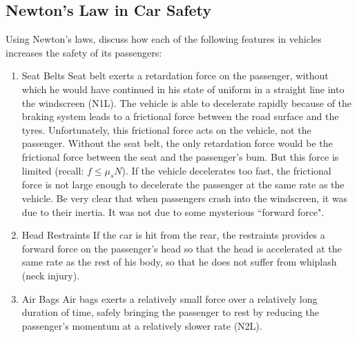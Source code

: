 \documentclass[11pt]{article}
\begin{document}
\begin{appendices}
		\section{Newton's Law in Car Safety}
		Using Newton's laws, discuss how each of the following features in vehicles increases the safety of its passengers:
		\begin{enumerate}
			\item Seat Belts
			\subitem Seat belt exerts a retardation force on the passenger, without which he would have continued in his state of uniform in a straight line into the windscreen (N1L).
			\subitem The vehicle is able to decelerate rapidly because of the braking system leads to a frictional force between the road surface and the tyres. Unfortunately, this frictional force acts on the vehicle, not the passenger. Without the seat belt, the only retardation force would be the frictional force between the seat and the passenger's bum. But this force is limited (recall: $f \leq \mu_s N$). If the vehicle decelerates too fast, the frictional force is not large enough to decelerate the passenger at the same rate as the vehicle.
			\subitem Be very clear that when passengers crash into the windscreen, it was due to their inertia. It was not due to some mysterious ``forward force".
			\item Head Restraints
			\subitem If the car is hit from the rear, the restraints provides a forward force on the passenger's head so that the head is accelerated at the same rate as the rest of his body, so that he does not suffer from whiplash (neck injury). 
			\item Air Bags
			\subitem Air bags exerts a relatively small force over a relatively long duration of time, safely bringing the passenger to rest by reducing the passenger's momentum at a relatively slower rate (N2L).
		\end{enumerate}
	\end{appendices}
\end{document}

